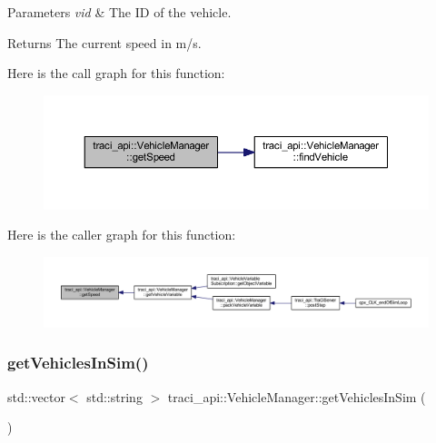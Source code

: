 \begin{DoxyParams}{Parameters}
{\em vid} & The ID of the vehicle. \\
\hline
\end{DoxyParams}
\begin{DoxyReturn}{Returns}
The current speed in m/s. 
\end{DoxyReturn}
Here is the call graph for this function\+:\nopagebreak
\begin{figure}[H]
\begin{center}
\leavevmode
\includegraphics[width=350pt]{classtraci__api_1_1_vehicle_manager_aa5f5a8c13bdd6b1407da5b5ffb6a8559_cgraph}
\end{center}
\end{figure}
Here is the caller graph for this function\+:\nopagebreak
\begin{figure}[H]
\begin{center}
\leavevmode
\includegraphics[width=350pt]{classtraci__api_1_1_vehicle_manager_aa5f5a8c13bdd6b1407da5b5ffb6a8559_icgraph}
\end{center}
\end{figure}
\mbox{\label{classtraci__api_1_1_vehicle_manager_ae70d2421d4a96ab7601dabb6fcc512b2}} 
\subsubsection{\texorpdfstring{get\+Vehicles\+In\+Sim()}{getVehiclesInSim()}}
{\footnotesize\ttfamily std\+::vector$<$ std\+::string $>$ traci\+\_\+api\+::\+Vehicle\+Manager\+::get\+Vehicles\+In\+Sim (\begin{DoxyParamCaption}{ }\end{DoxyParamCaption})}

